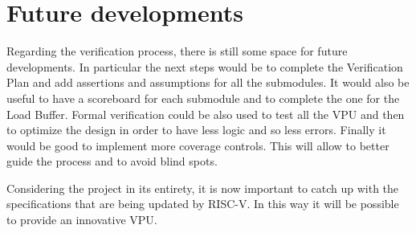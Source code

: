 \section{Future developments}
Regarding the verification process, there is still some space for future developments. In particular the next steps would be to complete the Verification Plan and add assertions and assumptions for all the submodules. 
It would also be useful to have a scoreboard for each submodule and to complete the one for the Load Buffer.
Formal verification could be also used to test all the VPU and then to optimize the design in order to have less logic and so less errors.
Finally it would be good to implement more coverage controls. This will allow to better guide the process and to avoid blind spots.

Considering the project in its entirety, it is now important to catch up with the specifications that are being updated by RISC-V. In this way it will be possible to provide an innovative VPU.



